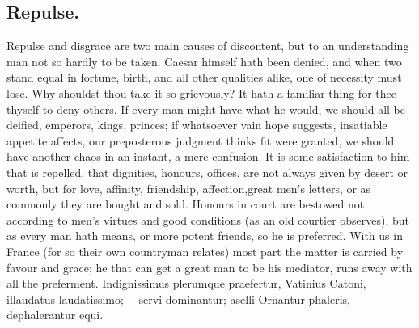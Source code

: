 {\subsection{Repulse.}
Repulse and disgrace are two main causes of discontent, but
to an understanding man not so hardly to be taken. Caesar himself hath
been denied, and when two stand equal in fortune, birth, and all
other qualities alike, one of necessity must lose. Why shouldst thou
take it so grievously? It hath a familiar thing for thee thyself to
deny others. If every man might have what he would, we should all be
deified, emperors, kings, princes; if whatsoever vain hope suggests,
insatiable appetite affects, our preposterous judgment thinks fit were
granted, we should have another chaos in an instant, a mere confusion.
It is some satisfaction to him that is repelled, that dignities,
honours, offices, are not always given by desert or worth, but for
love, affinity, friendship, affection,great men's letters, or as
commonly they are bought and sold. Honours in court are bestowed
not according to men's virtues and good conditions (as an old courtier
observes), but as every man hath means, or more potent friends, so he
is preferred. With us in France (for so their own countryman
relates) most part the matter is carried by favour and grace; he that
can get a great man to be his mediator, runs away with all the
preferment. Indignissimus plerumque praefertur, Vatinius Catoni,
illaudatus laudatissimo;
---servi dominantur; aselli
Ornantur phaleris, dephalerantur equi.

}
